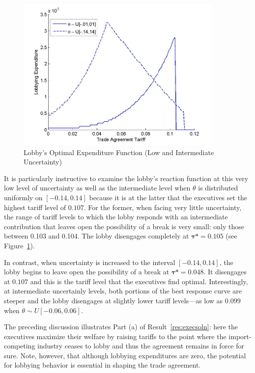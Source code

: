 \documentclass[10pt]{article}
\newcommand{\ve}{\theta}
\newcommand{\bta}{\bm{\tau^a}}
\begin{document}
\begin{figure}
\begin{center}
\includegraphics[height=3in, width=4in]{lobby_br.jpg}
\end{center}
\caption{Lobby's Optimal Expenditure Function (Low and Intermediate Uncertainty)\label{fig:lobby_br}}
\end{figure}

It is particularly instructive to examine the lobby's reaction function at this very low level of uncertainty as well as the intermediate level when $\ve$ is distributed uniformly on $[-0.14,0.14]$ because it is at the latter that the executives set the highest tariff level of $0.107$. For the former, when facing very little uncertainty, the range of tariff levels to which the lobby responds with an intermediate contribution that leaves open the possibility of a break is very small: only those between 0.103 and 0.104. The lobby disengages completely at $\bta=0.105$ (see Figure~\ref{fig:lobby_br}).

In contrast, when uncertainty is increased to the interval $[-0.14,0.14]$, the lobby begins to leave open the possibility of a break at $\bta = 0.048$. It disengages at $0.107$ and this is the tariff level that the executives find optimal. Interestingly, at intermediate uncertainly levels, both portions of the best response curve are steeper and the lobby disengages at slightly lower tariff levels---as low as $0.099$ when $\ve \sim U[-0.06,0.06]$.

The preceding discussion illustrates Part (a) of Result~\ref{res:execsoln}: here the executives maximize their welfare by raising tariffs to the point where the import-competing industry ceases to lobby and thus the agreement remains in force for sure. Note, however, that although lobbying expenditures are zero, the potential for lobbying behavior is essential in shaping the trade agreement.
\end{document}

